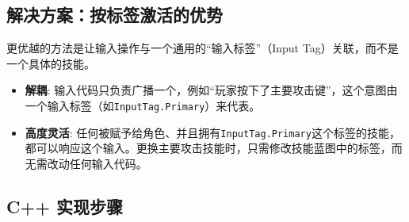 \documentclass[10pt,CJKmath]{zhbook-v1}
\begin{document}
\subsection{解决方案：按标签激活的优势}
更优越的方法是让输入操作与一个通用的“输入标签”（Input Tag）关联，而不是一个具体的技能。
\begin{itemize}
    \item \textbf{解耦}: 输入代码只负责广播一个，例如“玩家按下了主要攻击键”，这个意图由一个输入标签（如\texttt{InputTag.Primary}）来代表。
    \item \textbf{高度灵活}: 任何被赋予给角色、并且拥有\texttt{InputTag.Primary}这个标签的技能，都可以响应这个输入。更换主要攻击技能时，只需修改技能蓝图中的标签，而无需改动任何输入代码。
\end{itemize}

\subsection{C++ 实现步骤}
\end{document}
